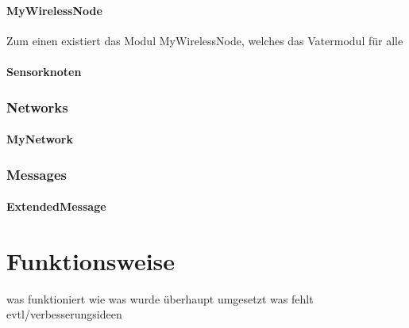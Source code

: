 \paragraph{MyWirelessNode}

Zum einen existiert das Modul MyWirelessNode, welches das Vatermodul für alle 

\paragraph{Sensorknoten}

\subsubsection{Networks}

\paragraph{MyNetwork}

\subsubsection{Messages}

\paragraph{ExtendedMessage}

\section{Funktionsweise}

was funktioniert wie
was wurde überhaupt umgesetzt
was fehlt evtl/verbesserungsideen